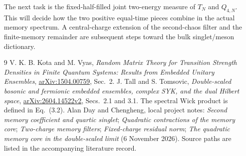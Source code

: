 \documentclass[11pt,a4paper]{article}
\begin{document}
The next task is the fixed-half-filled joint two-energy measure of
$T_N$ and $Q_{4,N}$. This will decide how the two positive equal-time
pieces combine in the actual memory spectrum. A central-charge
extension of the second-chaos filter and the finite-memory remainder
are subsequent steps toward the bulk singlet/meson dictionary.

\begin{thebibliography}{9}
 V. K. B. Kota and M. Vyas,
\emph{Random Matrix Theory for Transition Strength Densities in Finite
Quantum Systems: Results from Embedded Unitary Ensembles},
\href{https://arxiv.org/abs/1504.00759}{arXiv:1504.00759}, Sec.~2.
 J. Tall and S. Tomsovic,
\emph{Double-scaled bosonic and fermionic embedded ensembles,
complex SYK, and the dual Hilbert space},
\href{https://arxiv.org/html/2604.14522v2}{arXiv:2604.14522v2},
Secs.~2.1 and 3.1. The spectral Wick product is defined in Eq.~(3.2).
 Alan Day and Chengheng, local project notes:
\emph{Second memory coefficient and quartic singlet};
\emph{Quadratic contractions of the memory core};
\emph{Two-charge memory filters}; \emph{Fixed-charge residual norm};
\emph{The quadratic memory core in the double-scaled limit}
(6 November 2026). Source paths are listed in the accompanying
literature record.
\end{thebibliography}
\end{document}
